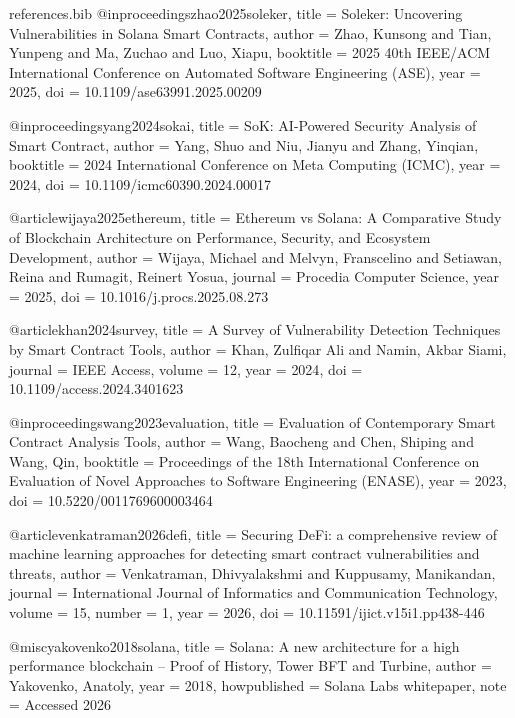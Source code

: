 \begin{filecontents*}{references.bib}
@inproceedings{zhao2025soleker,
  title     = {Soleker: Uncovering Vulnerabilities in {Solana} Smart Contracts},
  author    = {Zhao, Kunsong and Tian, Yunpeng and Ma, Zuchao and Luo, Xiapu},
  booktitle = {2025 40th {IEEE}/{ACM} International Conference on Automated
               Software Engineering ({ASE})},
  year      = {2025},
  doi       = {10.1109/ase63991.2025.00209}
}

@inproceedings{yang2024sokai,
  title     = {{SoK}: {AI}-Powered Security Analysis of Smart Contract},
  author    = {Yang, Shuo and Niu, Jianyu and Zhang, Yinqian},
  booktitle = {2024 International Conference on Meta Computing ({ICMC})},
  year      = {2024},
  doi       = {10.1109/icmc60390.2024.00017}
}

@article{wijaya2025ethereum,
  title   = {Ethereum vs {Solana}: A Comparative Study of Blockchain Architecture
             on Performance, Security, and Ecosystem Development},
  author  = {Wijaya, Michael and Melvyn, Franscelino and Setiawan, Reina and
             Rumagit, Reinert Yosua},
  journal = {Procedia Computer Science},
  year    = {2025},
  doi     = {10.1016/j.procs.2025.08.273}
}

@article{khan2024survey,
  title   = {A Survey of Vulnerability Detection Techniques by Smart Contract Tools},
  author  = {Khan, Zulfiqar Ali and Namin, Akbar Siami},
  journal = {{IEEE} Access},
  volume  = {12},
  year    = {2024},
  doi     = {10.1109/access.2024.3401623}
}

@inproceedings{wang2023evaluation,
  title     = {Evaluation of Contemporary Smart Contract Analysis Tools},
  author    = {Wang, Baocheng and Chen, Shiping and Wang, Qin},
  booktitle = {Proceedings of the 18th International Conference on Evaluation of
               Novel Approaches to Software Engineering ({ENASE})},
  year      = {2023},
  doi       = {10.5220/0011769600003464}
}

@article{venkatraman2026defi,
  title   = {Securing {DeFi}: a comprehensive review of machine learning approaches
             for detecting smart contract vulnerabilities and threats},
  author  = {Venkatraman, Dhivyalakshmi and Kuppusamy, Manikandan},
  journal = {International Journal of Informatics and Communication Technology},
  volume  = {15},
  number  = {1},
  year    = {2026},
  doi     = {10.11591/ijict.v15i1.pp438-446}
}

@misc{yakovenko2018solana,
  title        = {{Solana}: A new architecture for a high performance blockchain --
                  {Proof} of {History}, {Tower} {BFT} and {Turbine}},
  author       = {Yakovenko, Anatoly},
  year         = {2018},
  howpublished = {Solana Labs whitepaper},
  note         = {Accessed 2026}
}


\end{filecontents*}
